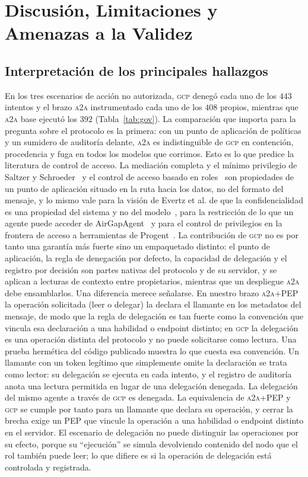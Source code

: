 \documentclass[conference,letterpaper]{IEEEtran}
\newcommand{\gcp}{\textsc{gcp}}
\newcommand{\ata}{\textsc{a2a}}
\begin{document}
\section{Discusi\'on, Limitaciones y Amenazas a la Validez}
\label{sec:threats}

\subsection{Interpretación de los principales hallazgos}
En los tres escenarios de acción no autorizada, \gcp{} denegó cada uno de los $443$ intentos y el brazo
\ata{} instrumentado cada uno de los $408$ propios, mientras que \ata{} base ejecutó los $392$
(Tabla~\ref{tab:gov}). La comparación que importa para la pregunta sobre el protocolo es la primera:
con un punto de aplicación de políticas y un sumidero de auditoría delante, \ata{} es indistinguible de
\gcp{} en contención, procedencia y fuga en todos los modelos que corrimos. Esto es lo que predice la
literatura de control de acceso. La mediación completa y el mínimo privilegio de Saltzer y
Schroeder~\citep{saltzer1975} y el control de acceso basado en roles~\citep{sandhu1996} son propiedades
de un punto de aplicación situado en la ruta hacia los datos, no del formato del mensaje, y lo mismo
vale para la visión de Evertz et al. de que la confidencialidad es una propiedad del sistema y no del
modelo~\citep{evertz2024whispers}, para la restricción de lo que un agente puede acceder de
AirGapAgent~\citep{bagdasarian2024airgap} y para el control de privilegios en la frontera de acceso a
herramientas de Progent~\citep{shi2025progent}. La contribución de \gcp{} no es por tanto una garantía
más fuerte sino un empaquetado distinto: el punto de aplicación, la regla de denegación por defecto, la
capacidad de delegación y el registro por decisión son partes nativas del protocolo y de su servidor, y
se aplican a lecturas de contexto entre propietarios, mientras que un despliegue \ata{} debe ensamblarlos.
Una diferencia merece señalarse. En nuestro brazo \ata{}+PEP la operación solicitada (leer o delegar)
la declara el llamante en los metadatos del mensaje, de modo que la regla de delegación es tan fuerte
como la convención que vincula esa declaración a una habilidad o endpoint distinto; en \gcp{} la
delegación es una operación distinta del protocolo y no puede solicitarse como lectura. Una prueba hermética del código publicado muestra
lo que cuesta esa convención. Un llamante con un token legítimo que simplemente omite la declaración se
trata como lector: su delegación se ejecuta en cada intento, y el registro de auditoría anota una
lectura permitida en lugar de una delegación denegada. La delegación del mismo agente a través de \gcp{}
es denegada. La equivalencia de \ata{}+PEP y \gcp{} se cumple por tanto para un llamante que declara su
operación, y cerrar la brecha exige un PEP que vincule la operación a una habilidad o endpoint distinto
en el servidor. El escenario de delegación no puede distinguir las operaciones por su efecto, porque su
``ejecución'' se simula devolviendo contenido del nodo que el rol también puede leer; lo que difiere es
si la operación de delegación está controlada y registrada.
\end{document}

